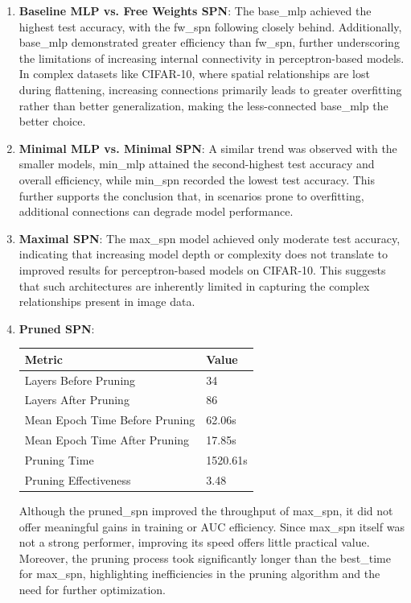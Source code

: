 \begin{enumerate}
\item \textbf{Baseline MLP vs. Free Weights SPN}: The base\_mlp achieved the highest test accuracy, with the fw\_spn following closely behind. Additionally, base\_mlp demonstrated greater efficiency than fw\_spn, further underscoring the limitations of increasing internal connectivity in perceptron-based models. In complex datasets like CIFAR-10, where spatial relationships are lost during flattening, increasing connections primarily leads to greater overfitting rather than better generalization, making the less-connected base\_mlp the better choice.
\item \textbf{Minimal MLP vs. Minimal SPN}: A similar trend was observed with the smaller models, min\_mlp attained the second-highest test accuracy and overall efficiency, while min\_spn recorded the lowest test accuracy. This further supports the conclusion that, in scenarios prone to overfitting, additional connections can degrade model performance.
\item \textbf{Maximal SPN}: The max\_spn model achieved only moderate test accuracy, indicating that increasing model depth or complexity does not translate to improved results for perceptron-based models on CIFAR-10. This suggests that such architectures are inherently limited in capturing the complex relationships present in image data.
\item \textbf{Pruned SPN}:
\begin{center}  %
\begin{tabular}{|l|l|}
\hline
\textbf{Metric} & \textbf{Value} \\
\hline
Layers Before Pruning & 34 \\
Layers After Pruning & 86 \\
Mean Epoch Time Before Pruning & 62.06s \\
Mean Epoch Time After Pruning & 17.85s \\
Pruning Time & 1520.61s \\
Pruning Effectiveness & 3.48 \\
\hline
\end{tabular}
\end{center}

Although the pruned\_spn improved the throughput of max\_spn, it did not offer meaningful gains in training or AUC efficiency. Since max\_spn itself was not a strong performer, improving its speed offers little practical value. Moreover, the pruning process took significantly longer than the best\_time for max\_spn, highlighting inefficiencies in the pruning algorithm and the need for further optimization.

\end{enumerate}

